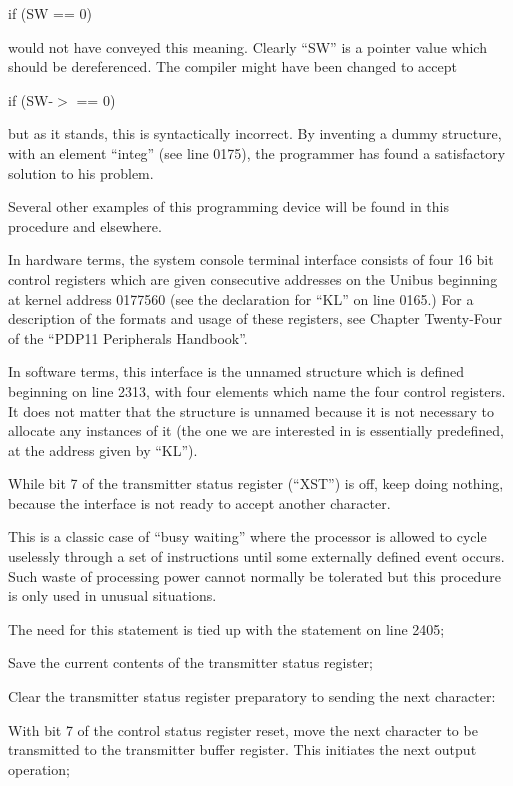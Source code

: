 if (SW == 0)

would not have conveyed this
meaning. Clearly ``SW'' is a
pointer value which should be
dereferenced. The compiler might
have been changed to accept

if (SW-$>$ == 0)

but as it stands, this is syntactically incorrect. By inventing a
dummy structure, with an element
``integ'' (see line 0175), the programmer has found a satisfactory
solution to his problem.
\ed

Several other examples of this programming device will be found in this
procedure and elsewhere.


In hardware terms, the system console
terminal interface consists of four 16
bit control registers which are given
consecutive addresses on the Unibus
beginning at kernel address 0177560
(see the declaration for ``KL'' on line
0165.) For a description of the formats
and usage of these registers, see
Chapter Twenty-Four of the ``PDP11 Peripherals Handbook''.

In software terms, this interface is
the unnamed structure which is defined
beginning on line 2313, with four elements which name the four control
registers. It does not matter that the
structure is unnamed because it is not
necessary to allocate any instances of
it (the one we are interested in is
essentially predefined, at the address
given by ``KL'').

\bd
\item[2393:] While bit 7 of the transmitter
 status register (``XST'') is off,
 keep doing nothing, because the
 interface is not ready to accept
 another character.
\ed

This is a classic case of ``busy waiting'' where the processor is allowed to
cycle uselessly through a set of
instructions until some externally
defined event occurs. Such waste of
processing power cannot normally be
tolerated but this procedure is only
used in unusual situations.

\bd
\item[2395:] The need for this statement is
 tied up with the statement on
 line 2405;

\item[2397:] Save the current contents of the
 transmitter status register;

\item[2398:] Clear the transmitter status
 register preparatory to sending
 the next character:

\item[2399:] With bit 7 of the control status
 register reset, move the next
 character to be transmitted to
 the transmitter buffer register.
 This initiates the next output
 operation;

